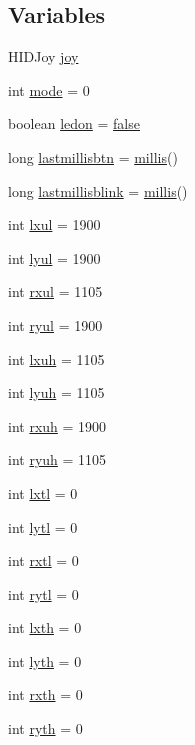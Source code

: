 \subsection*{Variables}
\begin{DoxyCompactItemize}
\item 
H\-I\-D\-Joy \hyperlink{USBtxEx_8ino_a007be0d4a5f1eeab33bfa3d8cd1a63a3}{joy}
\item 
int \hyperlink{USBtxEx_8ino_a1ea5d0cb93f22f7d0fdf804bd68c3326}{mode} = 0
\item 
boolean \hyperlink{USBtxEx_8ino_ab2140d645e3e795b240cdf70b7bc7c1a}{ledon} = \hyperlink{stdbool_8h_a65e9886d74aaee76545e83dd09011727}{false}
\item 
long \hyperlink{USBtxEx_8ino_a7839ec1641f6f4c0aa6790e095b8e128}{lastmillisbtn} = \hyperlink{wiringPi_8h_a941a22cb7e0f6429fe40f91e83ead3d9}{millis}()
\item 
long \hyperlink{USBtxEx_8ino_a7f5b47c849eef63c79b4d9bb7d7f8296}{lastmillisblink} = \hyperlink{wiringPi_8h_a941a22cb7e0f6429fe40f91e83ead3d9}{millis}()
\item 
int \hyperlink{USBtxEx_8ino_aa6fec60ec2aa8c5a5bafed3a065a138d}{lxul} = 1900
\item 
int \hyperlink{USBtxEx_8ino_a55b62414fa89038f95180ac7a687aefa}{lyul} = 1900
\item 
int \hyperlink{USBtxEx_8ino_a8b39276be6e96eca17230ee5b3c79dca}{rxul} = 1105
\item 
int \hyperlink{USBtxEx_8ino_acf351f756f45d66d2050da5f1fc42b60}{ryul} = 1900
\item 
int \hyperlink{USBtxEx_8ino_a4292e7f32256a5c878f8a7947ca07e16}{lxuh} = 1105
\item 
int \hyperlink{USBtxEx_8ino_ac705af2d3b08651b36ecd15e80ba2922}{lyuh} = 1105
\item 
int \hyperlink{USBtxEx_8ino_abfea8543614f15a6f21030432e388719}{rxuh} = 1900
\item 
int \hyperlink{USBtxEx_8ino_ab2ce2b094b3a0c5b7e13c7bae3dc2c76}{ryuh} = 1105
\item 
int \hyperlink{USBtxEx_8ino_af3d48f5fe6d1fec0c31b6d3482302acf}{lxtl} = 0
\item 
int \hyperlink{USBtxEx_8ino_a0b6d889f0afe0c143e19adafb28c4e64}{lytl} = 0
\item 
int \hyperlink{USBtxEx_8ino_aa61ea55df1be91d382798aab04625be1}{rxtl} = 0
\item 
int \hyperlink{USBtxEx_8ino_a6be04dbd0af0f5ed945df3621b70580f}{rytl} = 0
\item 
int \hyperlink{USBtxEx_8ino_aa3e6d73d993d921b550ccb402597f15b}{lxth} = 0
\item 
int \hyperlink{USBtxEx_8ino_a6ca09c5953ce45a5669119a3bc7877ae}{lyth} = 0
\item 
int \hyperlink{USBtxEx_8ino_a4a3663c7b40778146199b115d01ebf95}{rxth} = 0
\item 
int \hyperlink{USBtxEx_8ino_a8599d24fb59a5fe2202e41fe60fdfc3a}{ryth} = 0
\end{DoxyCompactItemize}


